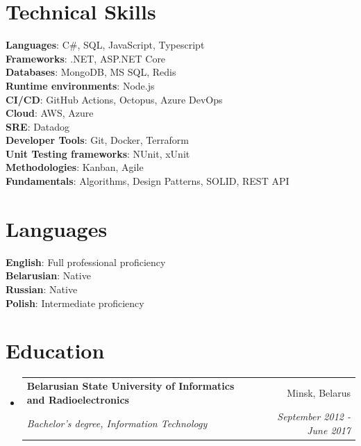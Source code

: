 \documentclass[letterpaper,11pt]{article}
\makeatletter
\newcommand{\resumeSubheading}[4]{
  \vspace{-2pt}\item
    \begin{tabular*}{0.97\textwidth}[t]{l@{\extracolsep{\fill}}r}
      \textbf{#1} & #2 \\
      \textit{\small#3} & \textit{\small #4} \\
    \end{tabular*}\vspace{-7pt}
}
\newcommand{\resumeSubHeadingListStart}{\begin{itemize}[leftmargin=0.15in, label={}]}
\newcommand{\resumeSubHeadingListEnd}{\end{itemize}}
\makeatother
\begin{document}
\section{Technical Skills}
 \begin{itemize}[leftmargin=0.15in, label={}]
    \small{\item{
     \textbf{Languages}{: C\#, SQL, JavaScript, Typescript} \\
     \textbf{Frameworks}{: .NET, ASP.NET Core} \\
     \textbf{Databases}{: MongoDB, MS SQL, Redis} \\
     \textbf{Runtime environments}{: Node.js} \\
     \textbf{CI/CD}{: GitHub Actions, Octopus, Azure DevOps} \\
     \textbf{Cloud}{: AWS, Azure} \\
     \textbf{SRE}{: Datadog} \\
     \textbf{Developer Tools}{: Git, Docker, Terraform} \\
     \textbf{Unit Testing frameworks}{: NUnit, xUnit} \\
     \textbf{Methodologies}{: Kanban, Agile} \\
     \textbf{Fundamentals}{: Algorithms, Design Patterns, SOLID, REST API} \\      
    }}
 \end{itemize}

\section{Languages}
 \begin{itemize}[leftmargin=0.15in, label={}]
    \small{\item{
     \textbf{English}{: Full professional proficiency} \\
     \textbf{Belarusian}{: Native} \\
     \textbf{Russian}{: Native} \\
     \textbf{Polish}{: Intermediate proficiency}
    }}
 \end{itemize}

\section{Education}
  \resumeSubHeadingListStart
    \resumeSubheading
      {Belarusian State University of Informatics and Radioelectronics}{ Minsk, Belarus}
      {Bachelor's degree, Information Technology}{September 2012 - June 2017}
  \resumeSubHeadingListEnd
\end{document}

